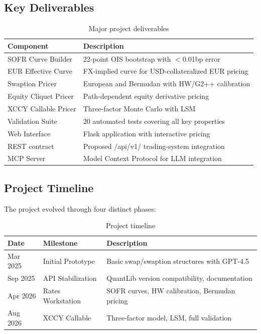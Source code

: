 \documentclass[10pt,a4paper]{article}
\begin{document}
\subsection{Key Deliverables}

\begin{table}[H]
\centering
\begin{tabular}{ll}
\toprule
\textbf{Component} & \textbf{Description} \\
\midrule
SOFR Curve Builder & 22-point OIS bootstrap with $<$0.01bp error \\
EUR Effective Curve & FX-implied curve for USD-collateralized EUR pricing \\
Swaption Pricer & European and Bermudan with HW/G2++ calibration \\
Equity Cliquet Pricer & Path-dependent equity derivative pricing \\
XCCY Callable Pricer & Three-factor Monte Carlo with LSM \\
Validation Suite & 20 automated tests covering all key properties \\
Web Interface & Flask application with interactive pricing \\
REST contract & Proposed /api/v1/ trading-system integration \\
MCP Server & Model Context Protocol for LLM integration \\
\bottomrule
\end{tabular}
\caption{Major project deliverables}
\end{table}

\subsection{Project Timeline}

The project evolved through four distinct phases:

\begin{table}[H]
\centering
\begin{tabular}{llp{8cm}}
\toprule
\textbf{Date} & \textbf{Milestone} & \textbf{Description} \\
\midrule
Mar 2025 & Initial Prototype & Basic swap/swaption structures with GPT-4.5 \\
Sep 2025 & API Stabilization & QuantLib version compatibility, documentation \\
Apr 2026 & Rates Workstation & SOFR curves, HW calibration, Bermudan pricing \\
Aug 2026 & XCCY Callable & Three-factor model, LSM, full validation \\
\bottomrule
\end{tabular}
\caption{Project timeline}
\end{table}
\end{document}

